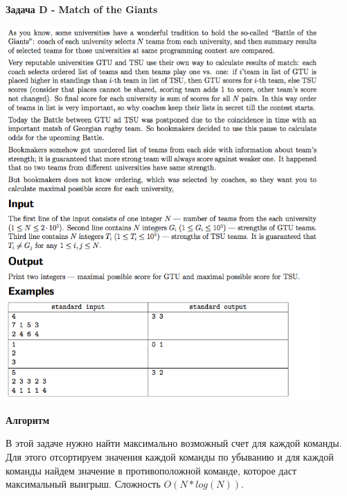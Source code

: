 \documentclass[a4paper,12pt]{article}
\begin{document}
\newpage
\textbf{{\large Задача D - Match of the Giants}}

\begin{center}
\includegraphics[width=0.9\textwidth]{OC_Siberia/D.png}\\ [1cm]
\end{center}

\textbf{{\large Алгоритм}}

В этой задаче нужно найти максимально возможный счет для каждой команды. Для этого отсортируем значения каждой команды по убыванию и для каждой команды найдем значение в противоположной команде, которое даст максимальный выигрыш. Сложность $O(N * log(N))$. \\
\end{document}
